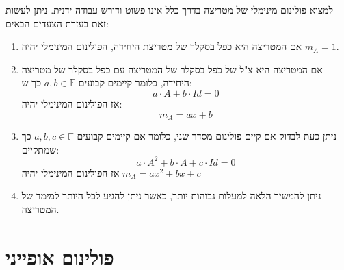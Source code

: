\documentclass{tstextbook}
\begin{document}
\begin{remark}
למצוא פולינום מינימלי של מטריצה בדרך כלל אינו פשוט ודורש עבודה ידנית. ניתן לעשות זאת בעזרת הצעדים הבאים:

  \begin{enumerate}
    \item אם המטריצה היא כפל בסקלר של מטריצת היחידה, הפולינום המינימלי יהיה \(m_{A}=1\). 


    \item אם המטריצה היא צ"ל של כפל בסקלר של המטריצה עם כפל בסקלר של מטריצה היחידה, כלומר קיימים קבועים \(a,b \in \mathbb{F}\) כך ש: 
$$a\cdot A+b\cdot Id = 0$$
אז הפולינום המינימלי יהיה:
$$m_{A}=ax+b$$


    \item ניתן כעת לבדוק אם קיים פולינום מסדר שני, כלומר אם קיימים קבועים \(a,b,c \in \mathbb{F}\) כך שמתקיים: 
$$a\cdot A^{2}+b\cdot A+ c\cdot Id = 0$$
אז הפולינום המינימלי יהיה \(m_{A}=ax^{2}+bx+c\)


    \item ניתן להמשיך הלאה למעלות גבוהות יותר, כאשר ניתן להגיע לכל היותר למימד של המטריצה. 


  \end{enumerate}
\end{remark}
\section{פולינום אופייני}
\end{document}
